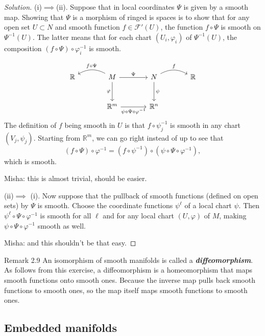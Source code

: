 \begin{proof}[Solution]\leavevmode
(i)$\implies $(ii). Suppose that in local coordinates $\Psi$ is given by a smooth map. Showing that $\Psi$ is a morphism of ringed is spaces is to show that for any open set $U \subset N$ and smooth function $f \in\mathcal{F}'(U)$, the function $f \circ \Psi$ is smooth on $\Psi^{-1}(U)$. The latter means that for each chart $(U_i,\varphi_i)$ of $\Psi^{-1}(U)$, the composition  $(f \circ\Psi)\circ \varphi_i^{-1}$ is smooth.

\[\begin{tikzcd}[column sep=large,row sep=large]
	\mathbb{R}&M\arrow[r,"\Psi"]\arrow[d,swap,"\varphi"]\arrow[l,swap,"f \circ \Psi",bend right]& N\arrow[d,"\psi"]\arrow[r,"f",bend left]&\mathbb{R}\\
	&\mathbb{R}^m\arrow[r,"\psi\circ\Psi\circ \varphi^{-1}",swap]&\mathbb{R}^n
\end{tikzcd}\]
The definition of $f$ being smooth in $U$ is that  $f \circ \psi^{-1}_j$ is smooth in any chart $(V_j,\psi_j)$. Starting from $\mathbb{R}^m$, we can go right instead of up to see that
\[(f \circ \Psi)\circ \varphi^{-1}=(f \circ \psi^{-1}) \circ (\psi \circ \Psi \circ\varphi^{-1}),\]
which is smooth.

{\color{2}Misha: this is almost trivial, should be easier.}

(ii)$\implies $ (i). Now suppose that the pullback of smooth functions (defined on open sets) by $\Psi$ is smooth. Choose the coordinate functions $\psi^\ell$ of a local chart $\psi$. Then $\psi^\ell \circ \Psi \circ \varphi^{-1}$ is smooth for all $\ell$ and for any local chart $(U,\varphi)$ of $M$, making $\psi \circ \Psi \circ \varphi^{-1}$ smooth as well.

{\color{2}Misha: and this shouldn't be that easy.}
\end{proof}

\begin{thing5}{Remark 2.9}\label{rk:2.9}\leavevmode
An isomorphism of smooth manifolds is called a \textit{\textbf{diffeomorphism}}. As follows from this exercise, a diffeomorphism is a homeomorphism that maps smooth functions onto smooth ones. {\color{14}Because the inverse map pulls back smooth functions to smooth ones, so the map itself maps smooth functions to smooth ones.}
\end{thing5}

\subsection{Embedded manifolds}

